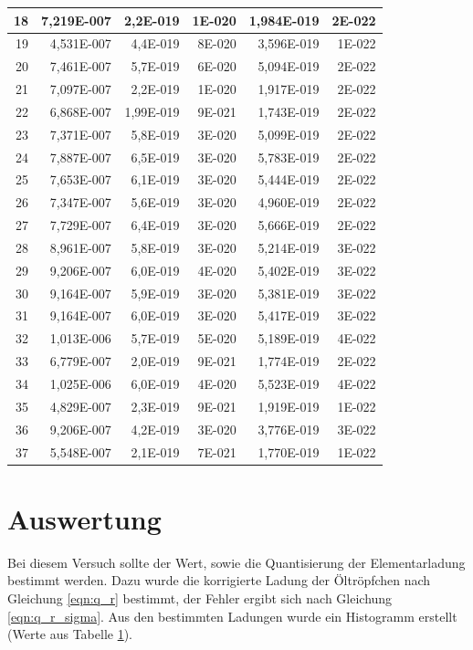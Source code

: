 \documentclass[12pt]{scrartcl}
\begin{document}
\begin{table}[H]
\begin{center}
\begin{tabular}{|r|r|r|r|r|r|}
18 & 7,219E-007 & 2,2E-019 & 1E-020 & 1,984E-019 & 2E-022 \\ \hline
19 & 4,531E-007 & 4,4E-019 & 8E-020 & 3,596E-019 & 1E-022 \\ \hline
20 & 7,461E-007 & 5,7E-019 & 6E-020 & 5,094E-019 & 2E-022 \\ \hline
21 & 7,097E-007 & 2,2E-019 & 1E-020 & 1,917E-019 & 2E-022 \\ \hline
22 & 6,868E-007 & 1,99E-019 & 9E-021 & 1,743E-019 & 2E-022 \\ \hline
23 & 7,371E-007 & 5,8E-019 & 3E-020 & 5,099E-019 & 2E-022 \\ \hline
24 & 7,887E-007 & 6,5E-019 & 3E-020 & 5,783E-019 & 2E-022 \\ \hline
25 & 7,653E-007 & 6,1E-019 & 3E-020 & 5,444E-019 & 2E-022 \\ \hline
26 & 7,347E-007 & 5,6E-019 & 3E-020 & 4,960E-019 & 2E-022 \\ \hline
27 & 7,729E-007 & 6,4E-019 & 3E-020 & 5,666E-019 & 2E-022 \\ \hline
28 & 8,961E-007 & 5,8E-019 & 3E-020 & 5,214E-019 & 3E-022 \\ \hline
29 & 9,206E-007 & 6,0E-019 & 4E-020 & 5,402E-019 & 3E-022 \\ \hline
30 & 9,164E-007 & 5,9E-019 & 3E-020 & 5,381E-019 & 3E-022 \\ \hline
31 & 9,164E-007 & 6,0E-019 & 3E-020 & 5,417E-019 & 3E-022 \\ \hline
32 & 1,013E-006 & 5,7E-019 & 5E-020 & 5,189E-019 & 4E-022 \\ \hline
33 & 6,779E-007 & 2,0E-019 & 9E-021 & 1,774E-019 & 2E-022 \\ \hline
34 & 1,025E-006 & 6,0E-019 & 4E-020 & 5,523E-019 & 4E-022 \\ \hline
35 & 4,829E-007 & 2,3E-019 & 9E-021 & 1,919E-019 & 1E-022 \\ \hline
36 & 9,206E-007 & 4,2E-019 & 3E-020 & 3,776E-019 & 3E-022 \\ \hline
37 & 5,548E-007 & 2,1E-019 & 7E-021 & 1,770E-019 & 1E-022 \\ \hline
\end{tabular}
\end{center}
\label{tab:messwerte_3}
\end{table}


\section{Auswertung}
Bei diesem Versuch sollte der Wert, sowie die Quantisierung der Elementarladung bestimmt werden. Dazu wurde die korrigierte Ladung der Öltröpfchen nach Gleichung \ref{eqn:q_r} bestimmt, der Fehler ergibt sich nach Gleichung \ref{eqn:q_r_sigma}. Aus den bestimmten Ladungen wurde ein Histogramm erstellt (Werte aus Tabelle \ref{tab:messwerte_3}).
\end{document}
